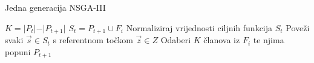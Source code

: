 \documentclass[times, utf8, zavrsni, numeric]{fer}
\begin{document}
\begin{algorithm}
\caption{Jedna generacija NSGA-III}
\label{algo:nsga3-one-gen}
\begin{algorithmic}
\ENDWHILE
{}
\STATE $K = \vert P_t \vert - \vert P_{t+1}\vert$
\STATE $S_t = P_{t+1} \cup F_i$
\STATE Normaliziraj vrijednosti ciljnih funkcija $S_t$
\STATE Poveži svaki $\vec{s} \in S_t$ s referentnom točkom $\vec{z} \in Z$
\STATE Odaberi $K$ članova iz $F_i$ te njima popuni $P_{t+1}$
\ENDIF
\end{algorithmic}
\end{algorithm}
\end{document}
